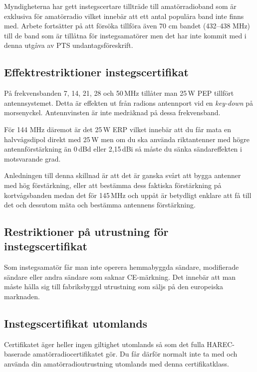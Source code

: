 \clearpage

Myndigheterna har gett instegscertare tillträde till amatörradioband som är
exklusiva för amatörradio vilket innebär att ett antal populära band inte
finns med. Arbete fortsätter på att försöka tillföra även 70 cm bandet
(432--438 MHz) till de band som är tillåtna för instegsamatörer men det har
inte kommit med i denna utgåva av PTS undantagsföreskrift.

\subsection{Effektrestriktioner instegscertifikat}

På frekvensbanden 7, 14, 21, 28 och 50\,MHz tillåter man 25\,W PEP tillfört
antennsystemet. Detta är effekten ut från radions antennport vid en {\it
  key-down} på morsenyckel. Antennvinsten är inte medräknad på dessa
frekvensband.

För 144 MHz däremot är det 25\,W ERP vilket innebär att du får mata en
halvvågsdipol direkt med 25\,W men om du ska använda riktantenner med högre
antennförstärkning än 0\,dBd eller 2,15\,dBi så måste du sänka sändareffekten
i motsvarande grad.

Anledningen till denna skillnad är att det är ganska svårt att bygga antenner
med hög förstärkning, eller att bestämma dess faktiska förstärkning på
kortvågsbanden medan det för 145\,MHz och uppåt är betydligt enklare att få
till det och dessutom mäta och bestämma antennens förstärkning.

\subsection{Restriktioner på utrustning för instegscertifikat}

Som instegsamatör får man inte operera hemmabyggda sändare, modifierade sändare
eller andra sändare som saknar CE-märkning. Det innebär att man måste hålla sig
till fabriksbyggd utrustning som säljs på den europeiska marknaden.

\subsection{Instegscertifikat utomlands}

Certifikatet äger heller ingen giltighet utomlands så som det fulla
HAREC-baserade amatörradiocertifikatet gör. Du får därför normalt inte ta med
och använda din amatörradioutrustning utomlands med denna certifikatklass.

